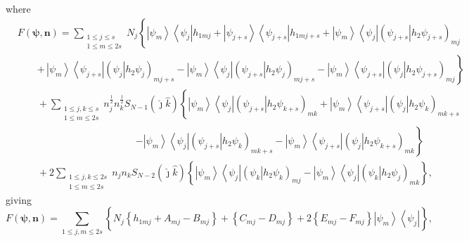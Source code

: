 \documentclass[aps,preprint]{revtex4}%
\begin{document}
where
\begin{align}
&  F\left(  \mathbf{\psi,n}\right)  =\sum_{\substack{1\leq j\leq s\\1\leq
m\leq2s}}N_{j}\left\{  \left\vert \psi_{m}\right\rangle \left\langle \psi
_{j}\right\vert h_{1mj}+\left\vert \psi_{j+s}\right\rangle \left\langle
\psi_{j+s}\right\vert h_{1mj+s}+\left\vert \psi_{m}\right\rangle \left\langle
\psi_{j}\right\vert \left(  \left.  \psi_{j+s}\right\vert h_{2}\psi
_{j+s}\right)  _{mj}\right.  \nonumber\\
&  \qquad\left.  +\,\left\vert \psi_{m}\right\rangle \left\langle \psi
_{j+s}\right\vert \left(  \left.  \psi_{j}\right\vert h_{2}\psi_{j}\right)
_{mj+s}-\left\vert \psi_{m}\right\rangle \left\langle \psi_{j}\right\vert
\left(  \left.  \psi_{j+s}\right\vert h_{2}\psi_{j}\right)  _{mj+s}-\left\vert
\psi_{m}\right\rangle \left\langle \psi_{j+s}\right\vert \left(  \left.
\psi_{j}\right\vert h_{2}\psi_{j+s}\right)  _{mj}\right\}  \nonumber\\
&  \qquad+\sum_{\substack{1\leq j,k\leq s\\1\leq m\leq2s}}n_{j}^{\frac{1}{2}%
}n_{k}^{\frac{1}{2}}S_{N-1}\left(  \hat{\jmath}\hat{k}\right)  \left\{
\left\vert \psi_{m}\right\rangle \left\langle \psi_{j}\right\vert \left(
\left.  \psi_{j+s}\right\vert h_{2}\psi_{k+s}\right)  _{mk}+\left\vert
\psi_{m}\right\rangle \left\langle \psi_{j+s}\right\vert \left(  \left.
\psi_{j}\right\vert h_{2}\psi_{k}\right)  _{mk+s}\right.  \nonumber\\
&  \qquad\qquad\qquad\qquad\qquad\qquad\left.  -\left\vert \psi_{m}%
\right\rangle \left\langle \psi_{j}\right\vert \left(  \left.  \psi
_{j+s}\right\vert h_{2}\psi_{k}\right)  _{mk+s}-\left\vert \psi_{m}%
\right\rangle \left\langle \psi_{j+s}\right\vert \left(  \left.  \psi
_{j}\right\vert h_{2}\psi_{k+s}\right)  _{mk}\right\}  \nonumber\\
&  \qquad+2\sum_{\substack{1\leq j,k\leq2s\\1\leq m\leq2s}}n_{j}n_{k}%
S_{N-2}\left(  \hat{\jmath}\hat{k}\right)  \left\{  \left\vert \psi
_{m}\right\rangle \left\langle \psi_{j}\right\vert \left(  \left.  \psi
_{k}\right\vert h_{2}\psi_{k}\right)  _{mj}-\left\vert \psi_{m}\right\rangle
\left\langle \psi_{j}\right\vert \left(  \left.  \psi_{k}\right\vert h_{2}%
\psi_{j}\right)  _{mk}\right\}  ,
\end{align}
giving%
\begin{equation}
F\left(  \mathbf{\psi,n}\right)  =\sum_{1\leq j,m\leq2s}\left\{  N_{j}\left\{
h_{1mj}+A_{mj}-B_{mj}\right\}  +\left\{  C_{mj}-D_{mj}\right\}  +2\overset
{}{\left\{  E_{mj}-F_{mj}\right\}  \left\vert \psi_{m}\right\rangle
\left\langle \psi_{j}\right\vert }\right\}  ,
\end{equation}%
\end{document}
